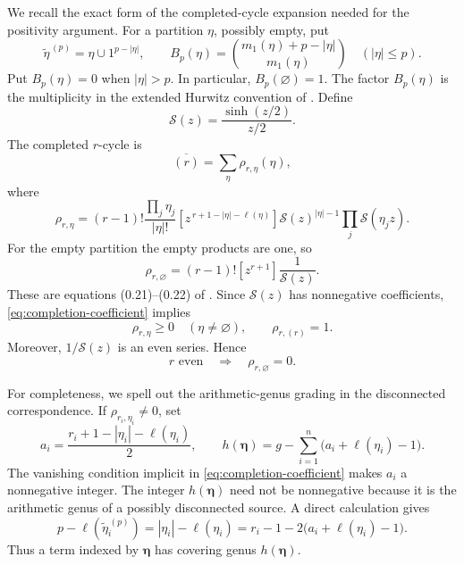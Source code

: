 \documentclass[10pt,a4paper]{amsart}
\numberwithin{equation}{section}
\begin{document}
We recall the exact form of the completed-cycle expansion needed for the
positivity argument.  For a partition $\eta$, possibly empty, put
\[
 \widetilde\eta^{\,(p)}=\eta\cup1^{p-|\eta|},\qquad
 B_p(\eta)=
 \binom{m_1(\eta)+p-|\eta|}{m_1(\eta)}
 \quad (|\eta|\leq p).
\]
Put $B_p(\eta)=0$ when $|\eta|>p$.  In particular,
$B_p(\varnothing)=1$.
The factor $B_p(\eta)$ is the multiplicity in the extended Hurwitz
convention of \cite[equation~(0.5)]{OkounkovPandharipande}.  Define
\[
 \mathcal S(z)=\frac{\sinh(z/2)}{z/2}.
\]
The completed $r$-cycle is
\begin{equation}\label{eq:completed-cycle-expansion}
 \overline{(r)}=\sum_\eta\rho_{r,\eta}(\eta),
\end{equation}
where
\begin{equation}\label{eq:completion-coefficient}
 \rho_{r,\eta}
 =(r-1)!\frac{\prod_j\eta_j}{|\eta|!}
 [z^{\,r+1-|\eta|-\ell(\eta)}]
 \mathcal S(z)^{|\eta|-1}\prod_j\mathcal S(\eta_jz).
\end{equation}
For the empty partition the empty products are one, so
\begin{equation}\label{eq:empty-completion-coefficient}
 \rho_{r,\varnothing}
 =(r-1)![z^{r+1}]\frac1{\mathcal S(z)}.
\end{equation}
These are equations (0.21)--(0.22) of
\cite{OkounkovPandharipande}.  Since $\mathcal S(z)$ has nonnegative
coefficients, \eqref{eq:completion-coefficient} implies
\begin{equation}\label{eq:completion-positivity}
 \rho_{r,\eta}\geq0\quad(\eta\neq\varnothing),
 \qquad \rho_{r,(r)}=1.
\end{equation}
Moreover, $1/\mathcal S(z)$ is an even series.  Hence
\begin{equation}\label{eq:even-empty-vanishing}
 r\text{ even}\quad\Longrightarrow\quad
 \rho_{r,\varnothing}=0.
\end{equation}

For completeness, we spell out the arithmetic-genus grading in the
disconnected correspondence.  If $\rho_{r_i,\eta_i}\neq0$, set
\begin{equation}\label{eq:completion-genus-loss}
 a_i=\frac{r_i+1-|\eta_i|-\ell(\eta_i)}2,
 \qquad
 h(\boldsymbol\eta)
 =g-\sum_{i=1}^n\bigl(a_i+\ell(\eta_i)-1\bigr).
\end{equation}
The vanishing condition implicit in
\eqref{eq:completion-coefficient} makes $a_i$ a nonnegative integer.  The
integer $h(\boldsymbol\eta)$ need not be nonnegative because it is the
arithmetic genus of a possibly disconnected source.  A direct calculation
gives
\begin{equation}\label{eq:completion-defect-identity}
 p-\ell(\widetilde\eta_i^{\,(p)})
 =|\eta_i|-\ell(\eta_i)
 =r_i-1-2\bigl(a_i+\ell(\eta_i)-1\bigr).
\end{equation}
Thus a term indexed by $\boldsymbol\eta$ has covering genus
$h(\boldsymbol\eta)$.
\end{document}
